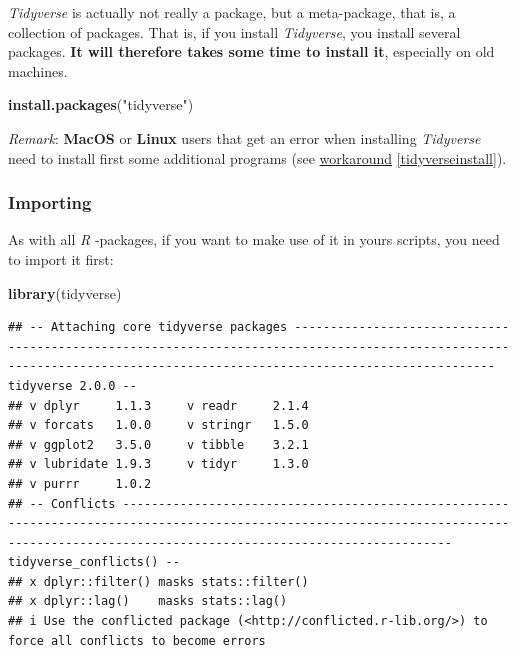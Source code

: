\documentclass[
]{scrartcl}
\newenvironment{Shaded}{\begin{snugshade}}{\end{snugshade}}
\newcommand{\KeywordTok}[1]{\textcolor[rgb]{0.13,0.29,0.53}{\textbf{#1}}}
\newcommand{\NormalTok}[1]{#1}
\newcommand{\StringTok}[1]{\textcolor[rgb]{0.31,0.60,0.02}{#1}}
\begin{document}
\emph{Tidyverse} is actually not really a package, but a meta-package, that is, a collection of packages. That is, if you install \emph{Tidyverse}, you install several packages. \textbf{It will therefore takes some time to install it}, especially on old machines.

\begin{Shaded}
\begin{Highlighting}[]
\KeywordTok{install.packages}\NormalTok{(}\StringTok{"tidyverse"}\NormalTok{)}
\end{Highlighting}
\end{Shaded}

\emph{Remark}: \textbf{MacOS} or \textbf{Linux} users that get an error when installing \emph{Tidyverse} need to install first some additional programs (see \protect\hyperlink{tidyverseinstall}{workaround} \ref{tidyverseinstall}).

\hypertarget{importing}{%
\subsubsection*{Importing}\label{importing}}

As with all \emph{R} -packages, if you want to make use of it in yours scripts, you need to import it first:

\begin{Shaded}
\begin{Highlighting}[]
\KeywordTok{library}\NormalTok{(tidyverse)}
\end{Highlighting}
\end{Shaded}

\begin{verbatim}
## -- Attaching core tidyverse packages ------------------------------------------------------------------------------------------------------------------------------------------------------------------------ tidyverse 2.0.0 --
## v dplyr     1.1.3     v readr     2.1.4
## v forcats   1.0.0     v stringr   1.5.0
## v ggplot2   3.5.0     v tibble    3.2.1
## v lubridate 1.9.3     v tidyr     1.3.0
## v purrr     1.0.2     
## -- Conflicts ------------------------------------------------------------------------------------------------------------------------------------------------------------------------------------------ tidyverse_conflicts() --
## x dplyr::filter() masks stats::filter()
## x dplyr::lag()    masks stats::lag()
## i Use the conflicted package (<http://conflicted.r-lib.org/>) to force all conflicts to become errors
\end{verbatim}
\end{document}
